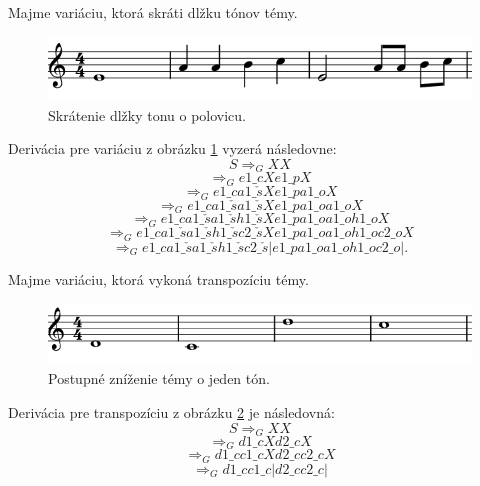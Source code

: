 \begin{example}
Majme variáciu, ktorá skráti dlžku tónov témy.
\begin{figure}[H]
    \centering
    \includegraphics[scale=0.4]{thesis/obrazky-figures/dimivar.png}
    \caption{Skrátenie dlžky tonu o polovicu.}
    \label{fig:skratenievar}
    \end{figure}
    Derivácia pre variáciu z obrázku \ref{fig:skratenievar} vyzerá následovne:
    $$ S \Rightarrow_G XX $$
    $$\Rightarrow_G e1\_cXe1\_pX $$
    $$\Rightarrow_G e1\_ca1\_\check{s}Xe1\_pa1\_oX $$
    $$\Rightarrow_G e1\_ca1\_\check{s}a1\_\check{s}Xe1\_pa1\_oa1\_oX $$
    $$\Rightarrow_G e1\_ca1\_\check{s}a1\_\check{s}h1\_\check{s}Xe1\_pa1\_oa1\_oh1\_oX $$
    $$\Rightarrow_G e1\_ca1\_\check{s}a1\_\check{s}h1\_\check{s}c2\_\check{s}Xe1\_pa1\_oa1\_oh1\_oc2\_oX $$
    $$\Rightarrow_G e1\_ca1\_\check{s}a1\_\check{s}h1\_\check{s}c2\_\check{s}|e1\_pa1\_oa1\_oh1\_oc2\_o|.$$
\end{example}

\begin{example}
Majme variáciu, ktorá vykoná transpozíciu témy.
\begin{figure}[H]
    \centering
    \includegraphics[scale=0.4]{thesis/obrazky-figures/transpos.png}
    \caption{Postupné zníženie témy o jeden tón.}
    \label{fig:transpovar}
    \end{figure}
    Derivácia pre transpozíciu z obrázku \ref{fig:transpovar} je následovná:
    $$ S \Rightarrow_G XX $$
    $$ \Rightarrow_G d1\_cXd2\_cX $$
    $$ \Rightarrow_G d1\_cc1\_cXd2\_cc2\_cX $$
    $$ \Rightarrow_G d1\_cc1\_c|d2\_cc2\_c| $$
\end{example}

